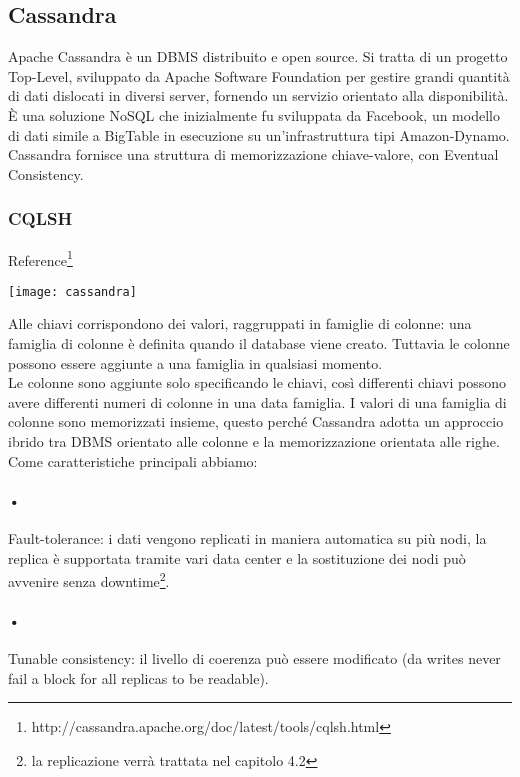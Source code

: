 \subsection{Cassandra}
\hspace{\parindent}Apache Cassandra è un DBMS distribuito e open source. Si tratta di un progetto Top-Level, sviluppato da Apache Software Foundation per gestire grandi quantità di dati dislocati in diversi server, fornendo un servizio orientato alla disponibilità.
\\È una soluzione NoSQL che inizialmente fu sviluppata da Facebook, un modello di dati simile a BigTable in esecuzione su un'infrastruttura tipi Amazon-Dynamo. Cassandra fornisce una struttura di memorizzazione chiave-valore, con Eventual Consistency.
\subsubsection{CQLSH}
Reference\footnote{http://cassandra.apache.org/doc/latest/tools/cqlsh.html}
\begin{center}
\texttt{[image: cassandra]}
\end{center}
Alle chiavi corrispondono dei valori, raggruppati in famiglie di colonne: una famiglia di colonne è definita quando il database viene creato. Tuttavia le colonne possono essere aggiunte a una famiglia in qualsiasi momento.
\\Le colonne sono aggiunte solo specificando le chiavi, così differenti chiavi possono avere differenti numeri di colonne in una data famiglia. I valori di una famiglia di colonne sono memorizzati insieme, questo perché Cassandra adotta un approccio ibrido tra DBMS orientato alle colonne e la memorizzazione orientata alle righe.
\\Come caratteristiche principali abbiamo:
\paragraph{•} Fault-tolerance: i dati vengono replicati in maniera automatica su più nodi, la replica è supportata tramite vari data center e la sostituzione dei nodi può avvenire senza downtime\footnote{la replicazione verrà trattata nel capitolo 4.2}.
\paragraph{•} Tunable consistency: il livello di coerenza può essere modificato (da writes never fail a block for all replicas to be readable).


